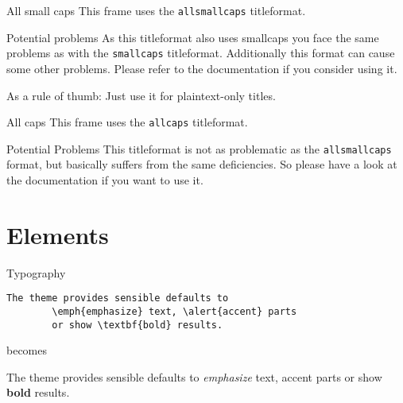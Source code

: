 \documentclass[10pt]{beamer}
\begin{document}
    {
    \begin{frame}{All small caps}
      This frame uses the \texttt{allsmallcaps} titleformat.

      \begin{alertblock}{Potential problems}
        As this titleformat also uses smallcaps you face the same problems as with the \texttt{smallcaps} titleformat. Additionally this format can cause some other problems. Please refer to the documentation if you consider using it.

        As a rule of thumb: Just use it for plaintext-only titles.
      \end{alertblock}
    \end{frame}
    }

    {
    \begin{frame}{All caps}
      This frame uses the \texttt{allcaps} titleformat.

      \begin{alertblock}{Potential Problems}
        This titleformat is not as problematic as the \texttt{allsmallcaps} format, but basically suffers from the same deficiencies. So please have a look at the documentation if you want to use it.
      \end{alertblock}
    \end{frame}
    }

    \section{Elements}

    \begin{frame}[fragile]{Typography}
      \begin{verbatim}The theme provides sensible defaults to
        \emph{emphasize} text, \alert{accent} parts
        or show \textbf{bold} results.\end{verbatim}

        \begin{center}becomes\end{center}

          The theme provides sensible defaults to \emph{emphasize} text,
          \alert{accent} parts or show \textbf{bold} results.
        \end{frame}
\end{document}
